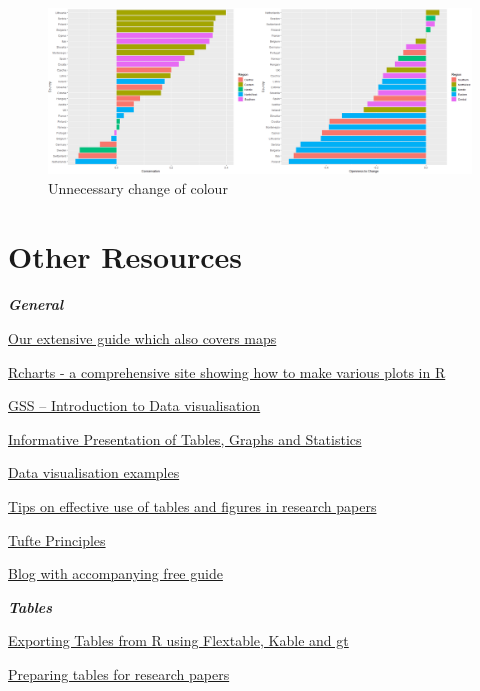 \documentclass[
  titlepage]{book}
\begin{document}
\begin{figure}
\centering
\includegraphics{img/b2b plots.png}
\caption{Unnecessary change of colour}
\end{figure}

\hypertarget{other-resources}{%
\section{Other Resources}\label{other-resources}}

\textbf{\emph{General}}

\href{}{Our extensive guide which also covers maps}

\href{https://r-charts.com/}{Rcharts - a comprehensive site showing how to make various plots in R}

\href{https://gss.civilservice.gov.uk/policy-store/introduction-to-data-visualisation/\#section-7}{GSS -- Introduction to Data visualisation}

\href{https://stats4sd.org/resources/412}{Informative Presentation of Tables, Graphs and Statistics}

\href{https://stats4sd.org/resources/59}{Data visualisation examples}

\href{https://www.editage.com/insights/tips-on-effective-use-of-tables-and-figures-in-research-papers}{Tips on effective use of tables and figures in research papers}

\href{https://sites.google.com/site/tufteondesign/home/six-fundamental-principles-of-design}{Tufte Principles}

\href{https://blog.hubspot.com/marketing/great-data-visualization-examples}{Blog with accompanying free guide}

\textbf{\emph{Tables}}

\href{https://stats4sd.org/resources/506}{Exporting Tables from R using Flextable, Kable and gt}

\href{https://www.manuscriptedit.com/scholar-hangout/preparing-tables-research-papers/}{Preparing tables for research papers}
\end{document}
